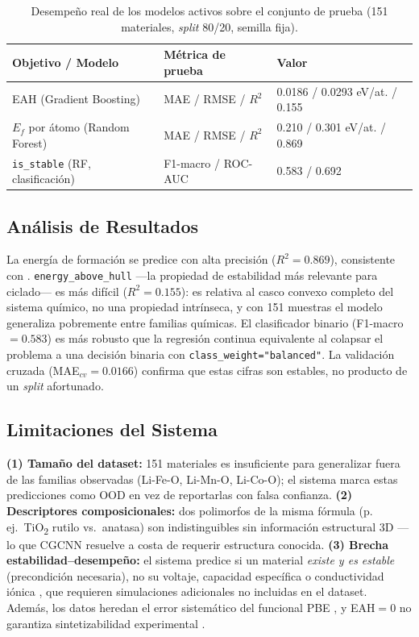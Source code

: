 \begin{table}[H]
\centering
\small
\caption{Desempeño real de los modelos activos sobre el conjunto de prueba (151 materiales, \textit{split} 80/20, semilla fija).}
\label{tab:resultados}
\begin{tabularx}{\textwidth}{l l X}
\toprule
\textbf{Objetivo / Modelo} & \textbf{Métrica de prueba} & \textbf{Valor} \\
\midrule
EAH (Gradient Boosting) & MAE / RMSE / $R^2$ & 0.0186 / 0.0293 eV/at. / 0.155 \\
$E_f$ por átomo (Random Forest) & MAE / RMSE / $R^2$ & 0.210 / 0.301 eV/at. / 0.869 \\
\texttt{is\_stable} (RF, clasificación) & F1-macro / ROC-AUC & 0.583 / 0.692 \\
\bottomrule
\end{tabularx}
\end{table}

\subsection{Análisis de Resultados}

La energía de formación se predice con alta precisión ($R^2=0.869$),
consistente con \citet{meredig2014combinatorial}. \texttt{energy\_above\_hull}
—la propiedad de estabilidad más relevante para ciclado— es más difícil
($R^2=0.155$): es relativa al casco convexo completo del sistema químico, no
una propiedad intrínseca, y con 151 muestras el modelo generaliza pobremente
entre familias químicas. El clasificador binario (F1-macro$=0.583$) es más
robusto que la regresión continua equivalente al colapsar el problema a una
decisión binaria con \texttt{class\_weight="balanced"}. La validación
cruzada (MAE$_{cv}=0.0166$) confirma que estas cifras son estables, no
producto de un \textit{split} afortunado.

\subsection{Limitaciones del Sistema}
\label{sec:limitaciones}

\textbf{(1) Tamaño del dataset:} 151 materiales es insuficiente para
generalizar fuera de las familias observadas (Li-Fe-O, Li-Mn-O, Li-Co-O); el
sistema marca estas predicciones como OOD en vez de reportarlas con falsa
confianza. \textbf{(2) Descriptores composicionales:} dos polimorfos de la
misma fórmula (p.\,ej.\ TiO\textsubscript{2} rutilo vs.\ anatasa) son
indistinguibles sin información estructural 3D —lo que CGCNN
\citep{xie2018cgcnn} resuelve a costa de requerir estructura conocida.
\textbf{(3) Brecha estabilidad–desempeño:} el sistema predice si un material
\emph{existe y es estable} (precondición necesaria), no su voltaje,
capacidad específica o conductividad iónica \citep{urban2016computational,
bachman2016inorganic}, que requieren simulaciones adicionales no incluidas
en el dataset. Además, los datos heredan el error sistemático del funcional
PBE \citep{perdew1996generalized}, y EAH$=0$ no garantiza sintetizabilidad
experimental \citep{sun2016thermodynamic, aykol2018thermodynamic}.

